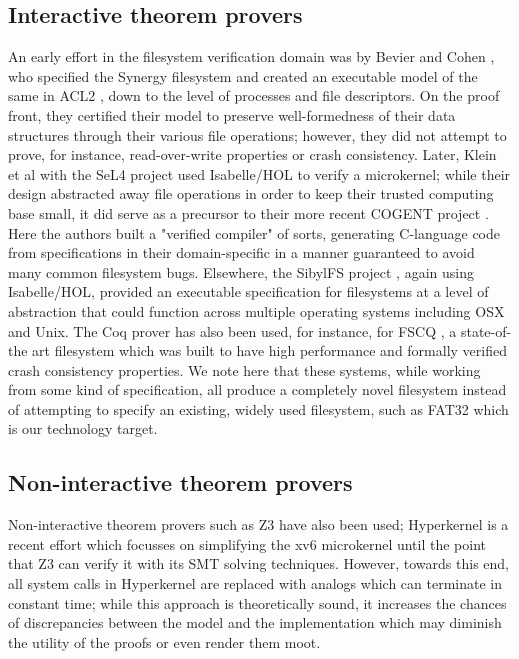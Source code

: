 \documentclass[runningheads,a4paper]{llncs}
\begin{document}
\subsection{Interactive theorem provers}
An early effort in the filesystem verification domain was by Bevier
and Cohen \cite{bevier1996executable}, who specified the Synergy
filesystem and created an executable model of the same in ACL2
\cite{kaufmann_manolios_moore_2000}, down to the level of processes
and file descriptors. On the proof front, they certified their model
to preserve well-formedness of their data structures through their
various file operations; however, they did not attempt to prove, for
instance, read-over-write properties or crash consistency. Later,
Klein et al with the SeL4 project \cite{klein2009sel4} used
Isabelle/HOL \cite{nipkow2002isabelle} to verify a microkernel;
while their design abstracted away file operations in order to keep
their trusted computing base small, it did serve as a precursor to their
more recent COGENT project \cite{amani2016cogent}. Here the authors
built a "verified compiler" of sorts, generating C-language code from
specifications in their domain-specific in a manner guaranteed to
avoid many common filesystem bugs. Elsewhere, the SibylFS project
\cite{ridge2015sibylfs}, again using Isabelle/HOL, provided
an executable specification for filesystems at a level of abstraction
that could function across multiple operating systems including OSX
and Unix. The Coq prover \cite{bertot2013interactive} has also been
used, for instance, for FSCQ
\cite{DBLP:conf/usenix/ChenZCCKZ16}, a state-of-the art filesystem
which was built to have high performance and formally verified crash
consistency properties. We note here that these systems, while working
from some kind of specification, all produce a completely novel
filesystem instead of attempting to specify an existing, widely used
filesystem, such as FAT32 which is our technology target.

\subsection{Non-interactive theorem provers}
Non-interactive theorem provers such as Z3 \cite{de2008z3}
have also been used; Hyperkernel
\cite{Nelson:2017:HPV:3132747.3132748} is a recent effort which
focusses on simplifying the xv6 microkernel until the point that Z3
can verify it with its SMT solving techniques. However, towards this
end, all system calls in Hyperkernel are replaced with analogs which
can terminate in constant time; while this approach is theoretically
sound, it increases the chances of discrepancies between the model and
the implementation which may diminish the utility of the proofs or
even render them moot.
\end{document}
